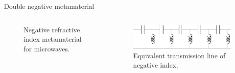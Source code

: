 \begin{frame}{Double negative metamaterial}
\begin{columns}
\begin{figure}
            \caption{Negative refractive index metamaterial for microwaves. \cite{Ung}}
            \label{fig:Negative_index}
        \end{figure}
        \vspace{-8mm}
        \begin{figure}
            \centering
            \includegraphics[width=\textwidth]{Figures/LHMM.pdf}
            \caption{Equivalent transmission line of negative index.}
            \label{fig:TL_LHMM}
        \end{figure}
        
    \end{columns}   
\end{frame}